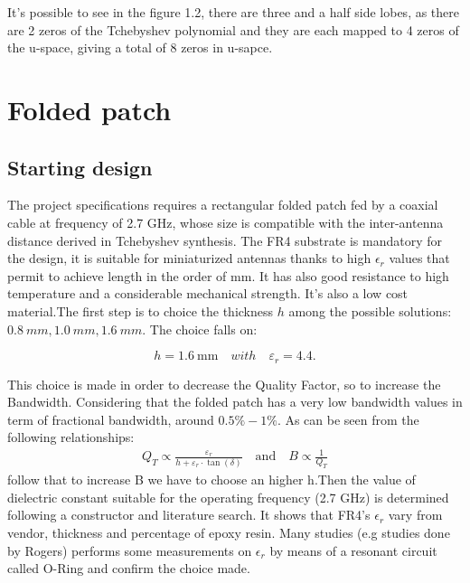 \documentclass[11pt]{report}
\begin{document}
It's possible to see in the figure 1.2, there are three and a half side lobes, as there are 2 zeros of the Tchebyshev polynomial and they are each mapped to 4 zeros of the u-space, giving a total of 8 zeros in u-sapce.

\chapter{Folded patch}
\section{Starting design}
The project specifications requires a rectangular folded patch fed by a coaxial cable at frequency of 2.7 GHz, whose size is compatible with the inter-antenna distance derived in Tchebyshev synthesis.\newline
The FR4 substrate is mandatory for the design, it is suitable for miniaturized antennas thanks to high $\epsilon_{r}$ values that permit to achieve length in the order of mm. It has also good resistance to high temperature and a considerable mechanical strength. It's also a low cost material.\newline The first step is to choice the thickness $h$ among the possible solutions: ${0.8 ~mm, 1.0 ~mm , 1.6 ~mm}$.  The choice falls on:

\begin{equation}
h=1.6 \mathrm{~mm} \quad with \quad \varepsilon_{r}=4.4.
\end{equation}

This choice is made in order to decrease the Quality Factor, so to increase the Bandwidth. Considering that the folded patch has a very low bandwidth values in term of fractional bandwidth, around $0.5\% - 1\%$. As can be seen from the following relationships:
\begin{equation}
\begin{array}{l}
Q_{T} \propto \frac{\varepsilon_{r}}{h+\varepsilon_{r} \cdot \tan (\delta)} \quad \text{and} \quad
B \propto \frac{1}{Q_{T}}
\end{array}
\end{equation}
follow that to increase B we have to choose an higher h.\newline Then the value of dielectric constant suitable for the operating frequency (2.7 GHz) is determined following a constructor and literature search. It shows that FR4's $\epsilon_{r}$ vary from vendor, thickness and percentage of epoxy resin.
Many studies (e.g studies done by Rogers) performs some measurements on $\epsilon_{r}$ by means of a resonant circuit called O-Ring and confirm the choice made.
\end{document}
